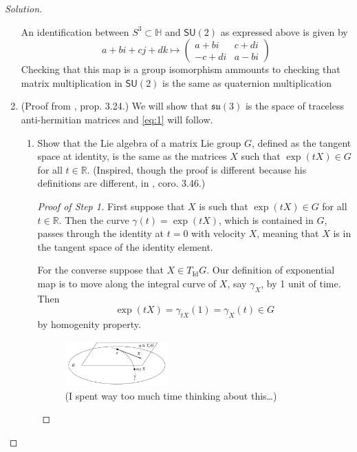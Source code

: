 \begin{proof}[Solution]
\begin{enumerate}[label=\alph*.]
			An identification between $S^3\subset \mathbb{H}$ and $\mathsf{SU}(2)$ as expressed above is given by
			\[a+bi+cj+dk\longmapsto \begin{pmatrix} a+bi&c+di\\-c+di&a-bi\end{pmatrix} \]
			Checking that this map is a group isomorphism ammounts to checking that matrix multiplication in $\mathsf{SU}(2)$ is the same as quaternion multiplication 


			\item (Proof from \cite{hall}, prop. 3.24.) We will show that $\mathfrak{su}(3)$ is the space of traceless anti-hermitian matrices and \cref{eq:1} will follow.
				\begin{enumerate}[label=\textbf{Step \arabic*}]
					\item Show that the Lie algebra of a matrix Lie group $G$, defined as the tangent space at identity, is the same as the matrices $X$ such that $ \operatorname{exp}(tX) \in G$ for all $t\in\mathbb{R}$. (Inspired, though the proof is different because his definitions are different, in \cite{hall}, coro. 3.46.)

						\begin{proof}[Proof of Step 1]\leavevmode
							First suppose that $X$ is such that $\operatorname{exp}(tX)\in G$ for all $t\in\mathbb{R}$. Then the curve $\gamma(t)=\operatorname{exp}(tX)$, which is contained in $G$, passes through the identity at $t=0$ with velocity $X$, meaning that $X$ is in the tangent space of the identity element.

							For the converse suppose that $X \in T_{\operatorname{Id}}G$. Our definition of exponential map is to move along the integral curve of $X$, say $\gamma_X$, by 1 unit of time. Then
							\[\operatorname{exp}(tX) =\gamma_{tX}(1)=\gamma_X(t)\in G\]
							by homogenity property.

	\begin{figure}[H]		\centering
		\includegraphics[width=0.4\textwidth]{fig2}	
	\caption*{(I spent way too much time thinking about this…)}\end{figure}


\end{proof}
\end{enumerate}
\end{enumerate}
\end{proof}
